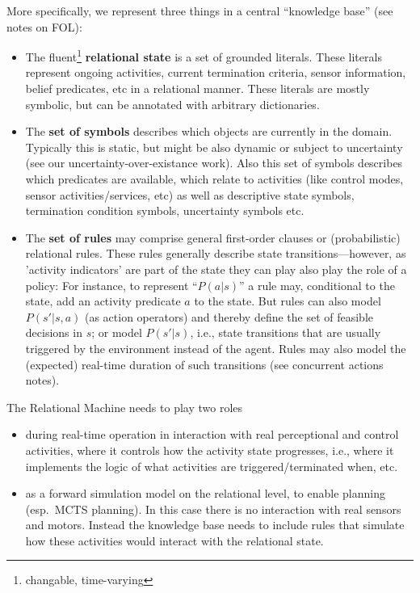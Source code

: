 \documentclass[10pt,fleqn,twoside]{article}
\begin{document}
More specifically, we represent three things in a central ``knowledge
base'' (see notes on FOL):
\begin{itemize}
\item The fluent\footnote{changable, time-varying} \textbf{relational
  state} is a set of grounded literals. These literals represent
  ongoing activities, current termination criteria, sensor
  information, belief predicates, etc in a relational manner. These
  literals are mostly symbolic, but can be annotated with arbitrary
  dictionaries.
\item  The \textbf{set of symbols} describes which objects are
  currently in the domain. Typically this is static, but might be also
  dynamic or subject to uncertainty (see our
  uncertainty-over-existance work). Also this set of symbols describes
  which predicates are available, which relate to activities (like
  control modes, sensor activities/services, etc) as well as
  descriptive state symbols, termination condition symbols,
  uncertainty symbols etc.
\item The \textbf{set of rules} may comprise general first-order
  clauses or (probabilistic) relational rules. These rules
  generally describe state transitions---however, as 'activity
  indicators' are part of the state they can play also play the role
  of a policy: For instance, to represent ``$P(a|s)$'' a rule may,
  conditional to the state, add an activity predicate $a$ to the
  state. But rules can also model $P(s'|s,a)$ (as action operators)
  and thereby define the set of feasible decisions in $s$; or model
  $P(s'|s)$, i.e., state transitions that are usually triggered by the
  environment instead of the agent. Rules may also model the
  (expected) real-time duration of such transitions (see concurrent
  actions notes).
\end{itemize}


The Relational Machine needs to play two roles
\begin{itemize}
\item during real-time operation in interaction with real perceptional
  and control activities, where it controls how the activity state
  progresses, i.e., where it implements the logic of what activities
  are triggered/terminated when, etc.
\item as a forward simulation model on the relational level, to enable
  planning (esp.\ MCTS planning). In this case there is no interaction
  with real sensors and motors. Instead the knowledge base needs to
  include rules that simulate how these activities would interact with
  the relational state.
\end{itemize}
\end{document}
